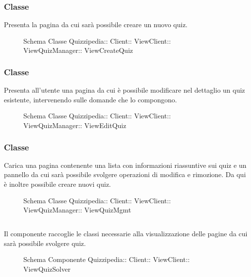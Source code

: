 \subsubsection{Classe }
Presenta la pagina da cui sarà possibile creare un nuovo quiz.
\begin{figure}[H]
\centering
\noindent{}
\caption[Schema Classe ViewCreateQuiz]{Schema Classe Quizzipedia:: Client:: ViewClient:: ViewQuizManager:: ViewCreateQuiz}
\end{figure}
\subsubsection{Classe }
Presenta all'utente una pagina da cui è possibile modificare nel dettaglio un quiz esistente, intervenendo sulle domande che lo compongono.
\begin{figure}[H]
\centering
\noindent{}
\caption[Schema Classe ViewEditQuiz]{Schema Classe Quizzipedia:: Client:: ViewClient:: ViewQuizManager:: ViewEditQuiz}
\end{figure}
\subsubsection{Classe }
Carica una pagina contenente una lista con informazioni riassuntive sui quiz e un pannello da cui sarà possibile svolgere operazioni di modifica e rimozione. Da qui è inoltre possibile creare nuovi quiz.
\begin{figure}[H]
\centering
\noindent{}
\caption[Schema Classe ViewQuizMgmt]{Schema Classe Quizzipedia:: Client:: ViewClient:: ViewQuizManager:: ViewQuizMgmt}
\end{figure}
\subsection{}
Il componente raccoglie le classi necessarie alla visualizzazione delle pagine da cui sarà possibile svolgere quiz.
\begin{figure}[H]
\centering
\noindent{}
\caption[Schema Componente Quizzipedia::Client::ViewClient::ViewQuizSolver]{Schema Componente Quizzipedia:: Client:: ViewClient:: ViewQuizSolver}
\end{figure}
